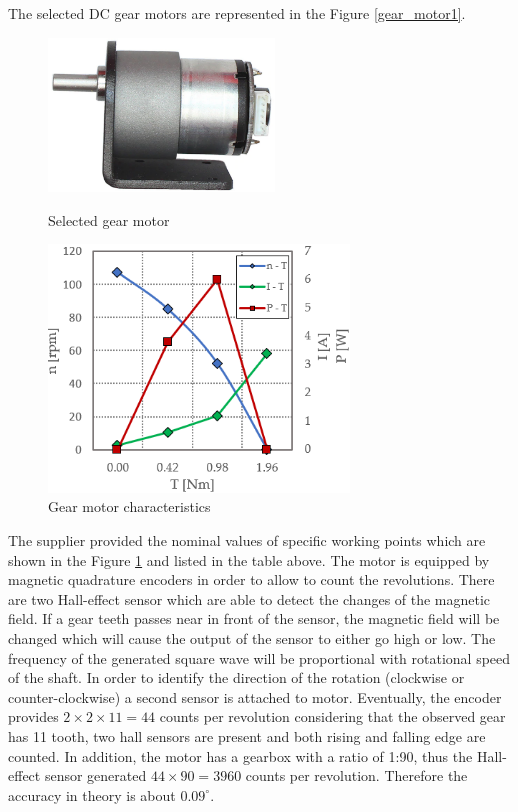 \documentclass[12pt,english]{article}
\begin{document}
The selected DC gear motors are represented in the Figure \ref{gear_motor1}.
\begin{figure}[htb!]
	\centering
	\centering
	\includegraphics[width=6cm]{figures/gear_motor1}
	\caption{Selected gear motor}
	\label{gear_motor1}
	\endminipage\hfill
	\centering
	\includegraphics[width=8cm]{figures/gear_motor2}
	\caption{Gear motor characteristics}
	\label{gear_motor2}
	\endminipage\hfill
\end{figure}

The supplier provided the nominal values of specific working points which are shown in the Figure \ref{gear_motor2} and listed in the table above.
The motor is equipped by magnetic quadrature encoders in order to allow to count the revolutions. There are two Hall-effect sensor which are able to detect the changes of the magnetic field. If a gear teeth passes near in front of the sensor, the magnetic field will be changed which will cause the output of the sensor to either go high or low. The frequency of the generated square wave will be proportional with rotational speed of the shaft. In order to identify the direction of the rotation (clockwise or counter-clockwise) a second sensor is attached to motor. Eventually, the encoder provides $2 \times 2 \times 11 = 44$ counts per revolution considering that the observed gear has 11 tooth, two hall sensors are present and both rising and falling edge are counted. In addition, the motor has a gearbox with a ratio of 1:90, thus the Hall-effect sensor generated $44 \times 90 = 3960$ counts per revolution. Therefore the accuracy in theory is about $0.09^{\circ}$.
\end{document}
